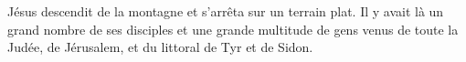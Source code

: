 \encetemps Jésus descendit de la montagne et s’arrêta sur un terrain plat.
Il y avait là un grand nombre de ses disciples
	et une grande multitude de gens venus de toute la Judée,
	de Jérusalem, et du littoral de Tyr et de Sidon.
